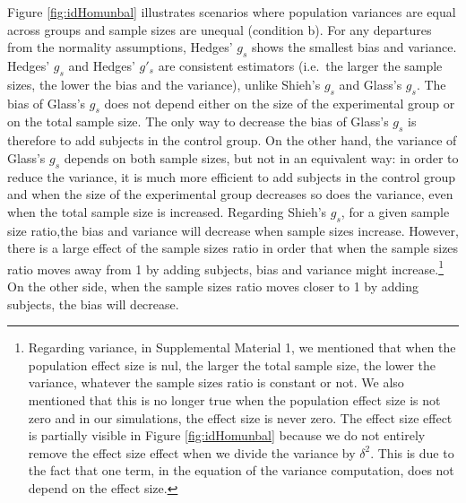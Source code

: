 \documentclass[
  man,floatsintext]{apa6}
\begin{document}
Figure \ref{fig:idHomunbal} illustrates scenarios where population variances are equal across groups and sample sizes are unequal (condition b). For any departures from the normality assumptions, Hedges' \(g_s\) shows the smallest bias and variance. Hedges' \(g_s\) and Hedges' \(g'_s\) are consistent estimators (i.e.~the larger the sample sizes, the lower the bias and the variance), unlike Shieh's \(g_s\) and Glass's \(g_s\). The bias of Glass's \(g_s\) does not depend either on the size of the experimental group or on the total sample size. The only way to decrease the bias of Glass's \(g_s\) is therefore to add subjects in the control group. On the other hand, the variance of Glass's \(g_s\) depends on both sample sizes, but not in an equivalent way: in order to reduce the variance, it is much more efficient to add subjects in the control group and when the size of the experimental group decreases so does the variance, even when the total sample size is increased. Regarding Shieh's \(g_s\), for a given sample size ratio,the bias and variance will decrease when sample sizes increase. However, there is a large effect of the sample sizes ratio in order that when the sample sizes ratio moves away from 1 by adding subjects, bias and variance might increase.\footnote{Regarding variance, in Supplemental Material 1, we mentioned that when the population effect size is nul, the larger the total sample size, the lower the variance, whatever the sample sizes ratio is constant or not. We also mentioned that this is no longer true when the population effect size is not zero and in our simulations, the effect size is never zero. The effect size effect is partially visible in Figure \ref{fig:idHomunbal} because we do not entirely remove the effect size effect when we divide the variance by $\delta^2$. This is due to the fact that one term, in the equation of the variance computation, does not depend on the effect size.} On the other side, when the sample sizes ratio moves closer to 1 by adding subjects, the bias will decrease.
\end{document}
